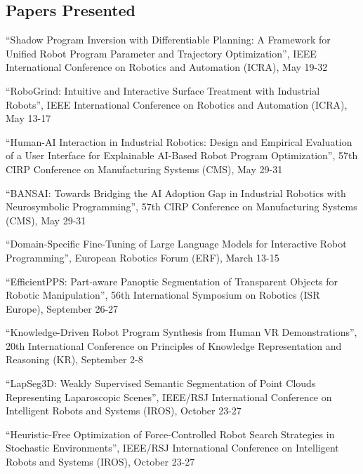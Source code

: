 \documentclass[11pt]{article} %
\begin{document}
\subsection*{Papers Presented}

``Shadow Program Inversion with Differentiable Planning: A Framework for Unified Robot Program Parameter and Trajectory Optimization'', IEEE International Conference on Robotics and Automation (ICRA), May 19-32

\medskip

``RoboGrind: Intuitive and Interactive Surface Treatment with Industrial Robots'', IEEE International Conference on Robotics and Automation (ICRA), May 13-17

\medskip

``Human-AI Interaction in Industrial Robotics: Design and Empirical Evaluation of a User Interface for Explainable AI-Based Robot Program Optimization'', 57th CIRP Conference on Manufacturing Systems (CMS), May 29-31

\medskip

``BANSAI: Towards Bridging the AI Adoption Gap in Industrial Robotics with Neurosymbolic Programming'', 57th CIRP Conference on Manufacturing Systems (CMS), May 29-31

\medskip

``Domain-Specific Fine-Tuning of Large Language Models for Interactive Robot Programming'', European Robotics Forum (ERF), March 13-15

\medskip


``EfficientPPS: Part-aware Panoptic Segmentation of Transparent Objects for Robotic Manipulation'', 56th International Symposium on Robotics (ISR Europe), September 26-27

\medskip

``Knowledge-Driven Robot Program Synthesis from Human VR Demonstrations'', 20th International Conference on Principles of Knowledge Representation and Reasoning (KR), September 2-8

\medskip


``LapSeg3D: Weakly Supervised Semantic Segmentation of Point Clouds Representing Laparoscopic Scenes'', IEEE/RSJ International Conference on Intelligent Robots and Systems (IROS), October 23-27

\medskip

``Heuristic-Free Optimization of Force-Controlled Robot Search Strategies in Stochastic Environments'', IEEE/RSJ International Conference on Intelligent Robots and Systems (IROS), October 23-27
\end{document}
